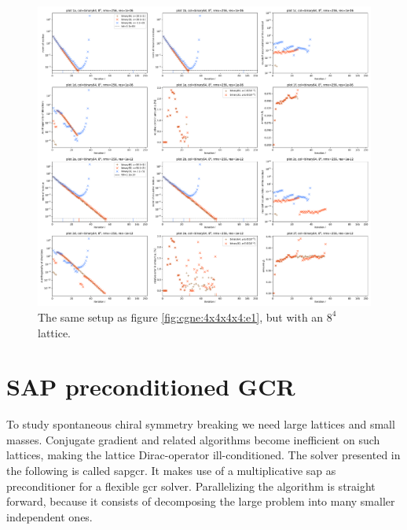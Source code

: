\documentclass{article}
\theoremstyle{plain} %
\theoremstyle{convention} %
\theoremstyle{remark} %
\numberwithin{equation}{section}
\begin{document}
\begin{figure}[h]
    \centering
    \includegraphics[width=1.0\textwidth]{plots/cgne_8x8x8x8_e1}
    \caption{The same setup as figure \ref{fig:cgne:4x4x4x4:e1}, but with an $8^4$ lattice.}
    \label{fig:cgne:8x8x8x8:e1}
\end{figure}

\section{SAP preconditioned GCR}

\label{sec:sap_gcr}

To study spontaneous chiral symmetry breaking we need large lattices and small masses. Conjugate gradient and related algorithms become inefficient on such lattices, making the lattice Dirac-operator ill-conditioned. The solver presented in the following is called \acrshort{sapgcr}. It makes use of a multiplicative \acrfull{sap} as preconditioner for a flexible \acrfull{gcr} solver. Parallelizing the algorithm is straight forward, because it consists of decomposing the large problem into many smaller independent ones.
\end{document}

